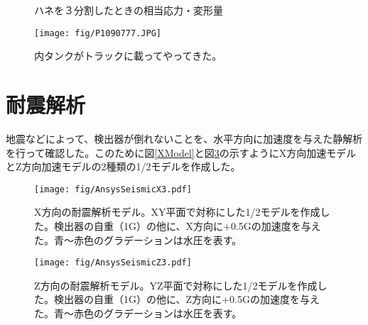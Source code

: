 \documentclass[11pt]{ltjsreport}
\newcommand{\figref}[1]{図\ref{#1}}
\begin{document}
\begin{figure}[htbp]
  \begin{minipage}{0.47\textwidth}
  \end{minipage}
  \hfill
  \begin{minipage}{0.47\textwidth}
  \end{minipage}
    \caption{ハネを３分割したときの相当応力・変形量}
  \label{AnsysFVOverlap3}
\end{figure}


\begin{figure}[htbp]
\begin{center}
\texttt{[image: fig/P1090777.JPG]}
\caption[内タンク]{内タンクがトラックに載ってやってきた。}
\label{InstallInnerTank}
\end{center}
\end{figure}
\fi

\section{耐震解析}
地震などによって、検出器が倒れないことを、水平方向に加速度を与えた静解析を行って確認した。このために\figref{XModel}と\figref{ZModel}の示すようにX方向加速モデルとZ方向加速モデルの2種類の1/2モデルを作成した。


\begin{figure}[!h]
\begin{minipage}{0.47\textwidth}
\centering
\texttt{[image: fig/AnsysSeismicX3.pdf]}
\caption[耐震解析モデル：X方向]{X方向の耐震解析モデル。XY平面で対称にした1/2モデルを作成した。検出器の自重（1G）の他に、X方向に+0.5Gの加速度を与えた。青〜赤色のグラデーションは水圧を表す。}
\label{XModel}
\end{minipage}
\hfill
\begin{minipage}{0.47\textwidth}
\centering
\texttt{[image: fig/AnsysSeismicZ3.pdf]}
\caption[耐震解析モデル：Z方向]{Z方向の耐震解析モデル。YZ平面で対称にした1/2モデルを作成した。検出器の自重（1G）の他に、Z方向に+0.5Gの加速度を与えた。青〜赤色のグラデーションは水圧を表す。}
\label{ZModel}
\end{minipage}
\end{figure}
\end{document}
